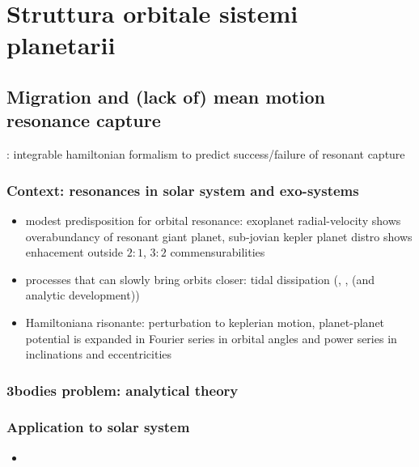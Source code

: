 \documentclass[main.tex]{subfiles}
\begin{document}
{\let\clearpage\relax
\chapter{Struttura orbitale sistemi planetarii}
}

\begin{refsection}
\begingroup
\nocite{*}
\let\clearpage\relax
\printbibliography[filter={pps},heading=bibintoc,title={\textcolor{antiquefuchsia}{Evoluzione orbitale in PPD e dopo che \'e dissipato}}]
\endgroup
\end{refsection}

\section{Migration and (lack of) mean motion resonance capture}
\cite{batygin2015capture}: integrable hamiltonian formalism to predict success/failure of resonant capture
\subsection{Context: resonances in solar system and exo-systems}

\begin{itemize}
\item modest predisposition for orbital resonance: exoplanet radial-velocity shows overabundancy of resonant giant planet, sub-jovian kepler planet distro shows enhacement outside $2:1$, $3:2$ commensurabilities
\item processes that can slowly bring orbits closer: tidal dissipation (\cite{goldreich1966q}, \cite{yoder1981tides}, \cite{peale1976orbital} (and analytic development))    
\item Hamiltoniana risonante: perturbation to keplerian motion, planet-planet potential is expanded in Fourier series in orbital angles and power series in inclinations and eccentricities
\end{itemize}

\subsection{3bodies problem: analytical theory}

\subsection{Application to solar system}
\begin{itemize}
    \item 
\end{itemize}
\end{document}
